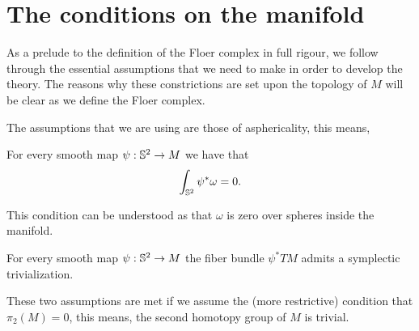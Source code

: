 \section{The conditions on the manifold}

As a prelude to the definition of the Floer complex in full rigour, we follow through the essential assumptions that we need to make in order to develop the theory. The reasons why these constrictions are set upon the topology of $M$ will be clear as we define the Floer complex.

The assumptions that we are using are those of asphericality, this means,

\begin{assump} \label{assumption1}
For every smooth map $\psi : \mathbb{S}^2 \rightarrow M$ we have that
\[\int_{\mathbb{S}^2} \psi^{\ast} \omega = 0 .\]
\end{assump}

This condition can be understood as that $\omega$ is zero over spheres inside the manifold.

\begin{assump} \label{assumption2}
For every smooth map $\psi : \mathbb{S}^2 \rightarrow M$ the fiber bundle $\psi^{\ast} TM$ admits a symplectic trivialization.
\end{assump}

These two assumptions are met if we assume the (more restrictive) condition that $\pi_2(M) = 0$, this means, the second homotopy group of $M$ is trivial.
